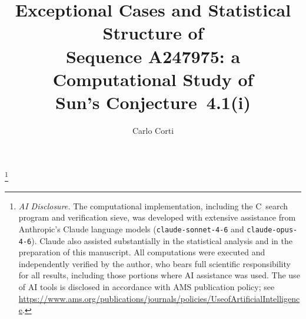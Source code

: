 \documentclass{amsart}
\theoremstyle{definition}
\theoremstyle{remark}
\numberwithin{equation}{section}
\begin{document}

\title[Exceptional Cases of Sequence A247975]
{Exceptional Cases and Statistical Structure of\\
Sequence A247975: a Computational Study of\\
Sun's Conjecture~4.1(i)}

\author[C. Corti]{Carlo Corti}
\address{Independent researcher, 21-040~Kalin\'owka, Poland}

\thanks{%
  \textit{AI Disclosure.}
  The computational implementation, including the C~search program
  and verification sieve, was developed with extensive assistance
  from Anthropic's Claude language models
  (\texttt{claude-sonnet-4-6} and \texttt{claude-opus-4-6}).
  Claude also assisted substantially in the statistical analysis
  and in the preparation of this manuscript.
  All computations were executed and independently verified by the
  author, who bears full scientific responsibility for all results,
  including those portions where AI assistance was used.
  The use of AI tools is disclosed in accordance with AMS publication
  policy; see
  \url{https://www.ams.org/publications/journals/policies/UseofArtificialIntelligence}.%
}



\date{}
\end{document}
